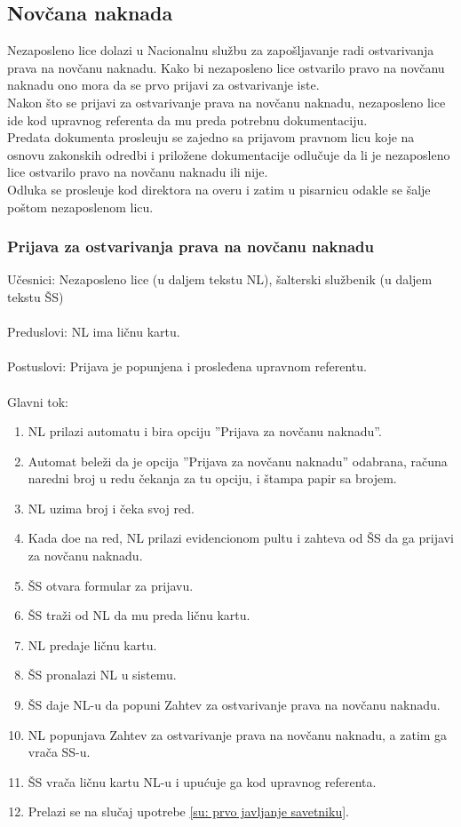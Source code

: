\subsection{Nov\v cana naknada}

Nezaposleno lice dolazi u Nacionalnu slu\v zbu za zapo\v sljavanje radi ostvarivanja prava na nov\v canu naknadu. Kako bi nezaposleno lice ostvarilo pravo na nov\v canu naknadu ono mora da se prvo prijavi za ostvarivanje iste.
\\
Nakon \v sto se prijavi za ostvarivanje prava na nov\v canu naknadu, nezaposleno lice ide kod upravnog referenta da mu preda potrebnu dokumentaciju.
\\ Predata dokumenta prosle\dj uju se zajedno sa prijavom pravnom licu koje na osnovu zakonskih odredbi i priložene dokumentacije odlu\v cuje da li je nezaposleno lice ostvarilo pravo na nov\v canu naknadu ili nije.
\\
Odluka se prosle\dj uje kod direktora na overu i zatim u pisarnicu odakle se \v salje po\v stom nezaposlenom licu.

\subsubsection{Prijava za ostvarivanja prava na nov\v canu naknadu}

\noindent Učesnici: Nezaposleno lice (u daljem tekstu NL), šalterski službenik (u daljem tekstu ŠS)
\\
\\ Preduslovi: NL ima ličnu kartu.
\\
\\ Postuslovi: Prijava je popunjena i prosleđena upravnom referentu.
\\
\\ Glavni tok:
\begin{enumerate}
\item NL prilazi automatu i bira opciju ''Prijava za novčanu naknadu''.
\item Automat bele\v zi da je opcija ''Prijava za novčanu naknadu'' odabrana, ra\v cuna naredni broj u redu \v cekanja za tu opciju, i \v stampa papir sa brojem.
\item NL uzima broj i \v ceka svoj red.
	\item Kada do\dj e na red, NL prilazi evidencionom pultu i zahteva od \v SS da ga prijavi za novčanu naknadu.
	\item \v SS otvara formular za prijavu.
	\item \v SS tra\v zi od NL da mu preda li\v cnu kartu.
	\item NL predaje li\v cnu kartu.
    \item \v SS pronalazi NL u sistemu.
	\item \v SS daje NL-u da popuni Zahtev za ostvarivanje prava na novčanu naknadu.
	\item NL popunjava Zahtev za ostvarivanje prava na novčanu naknadu, a zatim ga vra\v ca SS-u.
	\item \v SS vra\v ca ličnu kartu NL-u i upućuje ga kod upravnog referenta.
	\item Prelazi se na slu\v caj upotrebe \ref{su: prvo javljanje savetniku}.
\end{enumerate}

